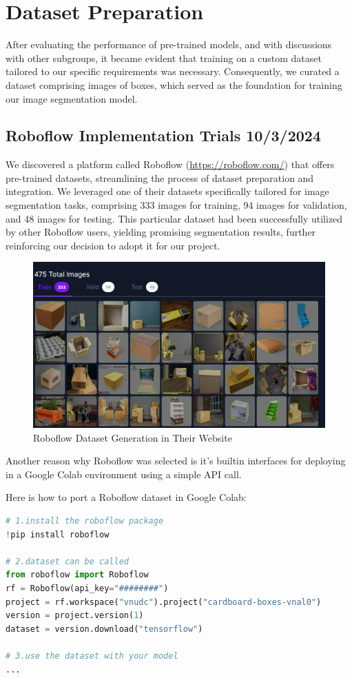 \chapter{Dataset Preparation }
After evaluating the performance of pre-trained models, and with discussions with other subgroups, it became evident that training on a custom dataset tailored to our specific requirements was necessary. Consequently, we curated a dataset comprising images of boxes, which served as the foundation for training our image segmentation model.

\section{Roboflow Implementation Trials 10/3/2024}
We discovered a platform called Roboflow (\url{https://roboflow.com/}) that offers pre-trained datasets, streamlining the process of dataset preparation and integration. We leveraged one of their datasets specifically tailored for image segmentation tasks, comprising 333 images for training, 94 images for validation, and 48 images for testing. This particular dataset had been successfully utilized by other Roboflow users, yielding promising segmentation results, further reinforcing our decision to adopt it for our project.

\begin{figure}[H]
      \centering
      \includegraphics[width=450pt]{assets/roboflow}
      \caption{Roboflow Dataset Generation in Their Website}
      \label{fig:using:roboflowgen}
\end{figure}

Another reason why Roboflow was selected is it’s builtin interfaces for deploying in a Google Colab environment using a simple API call.

Here is how to port a Roboflow dataset in Google Colab:
\begin{lstlisting}[language=Python]
# 1.install the roboflow package
!pip install roboflow

# 2.dataset can be called
from roboflow import Roboflow
rf = Roboflow(api_key="########")
project = rf.workspace("vnudc").project("cardboard-boxes-vnal0")
version = project.version(1)
dataset = version.download("tensorflow")

# 3.use the dataset with your model
...
\end{lstlisting}

